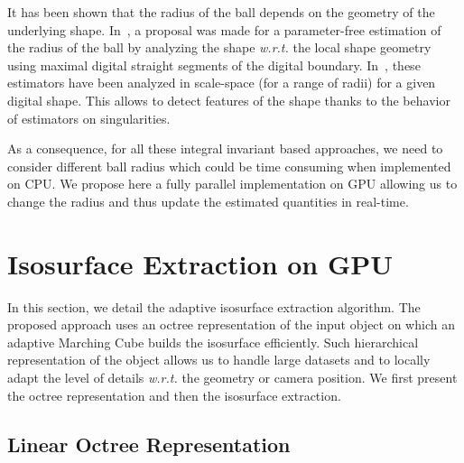 \documentclass{llncs}
\newcommand{\wrt}{\emph{w.r.t.}\xspace}
\begin{document}
It has been shown that the radius of the ball depends on the geometry of the
underlying shape. In~\cite{DGCI2014}, a proposal was made for a parameter-free
estimation of the radius of the ball by analyzing the shape \wrt the local shape
geometry using maximal digital straight segments of the digital boundary.
In~\cite{SMI2015}, these estimators have been analyzed in scale-space (for a
range of radii) for a given digital shape. This allows to detect features of
the shape thanks to the behavior of estimators on singularities.

As a consequence, for all these integral invariant based approaches, we need to
consider different ball radius which could be time consuming when implemented on
CPU\@. We propose here a fully parallel implementation on GPU allowing us to
change the radius and thus update the estimated quantities in real-time.

\section{Isosurface Extraction on GPU}
\label{sec:isos-extr-gpu}

In this section, we detail the adaptive isosurface extraction
algorithm.
The proposed approach uses an octree representation of the input object
on which an adaptive Marching Cube builds the isosurface efficiently.
Such
hierarchical representation of the object allows us
to handle large datasets and to locally adapt the level of details
\wrt the geometry or camera position. We first present the
octree representation and then the isosurface extraction.

\subsection{Linear Octree Representation}
\end{document}
